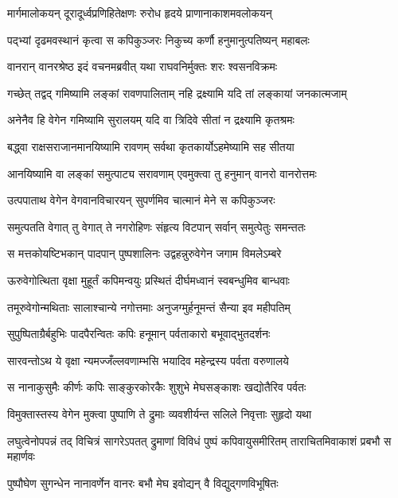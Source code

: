 \twolineshloka
{मार्गमालोकयन् दूरादूर्ध्वप्रणिहितेक्षणः}
{रुरोध हृदये प्राणानाकाशमवलोकयन्} %

\twolineshloka
{पद्भ्यां दृढमवस्थानं कृत्वा स कपिकुञ्जरः}
{निकुच्य कर्णौ हनुमानुत्पतिष्यन् महाबलः} %

\twolineshloka
{वानरान् वानरश्रेष्ठ इदं वचनमब्रवीत्}
{यथा राघवनिर्मुक्तः शरः श्वसनविक्रमः} %

\twolineshloka
{गच्छेत् तद्वद् गमिष्यामि लङ्कां रावणपालिताम्}
{नहि द्रक्ष्यामि यदि तां लङ्कायां जनकात्मजाम्} %

\twolineshloka
{अनेनैव हि वेगेन गमिष्यामि सुरालयम्}
{यदि वा त्रिदिवे सीतां न द्रक्ष्यामि कृतश्रमः} %

\twolineshloka
{बद्ध्वा राक्षसराजानमानयिष्यामि रावणम्}
{सर्वथा कृतकार्योऽहमेष्यामि सह सीतया} %

\twolineshloka
{आनयिष्यामि वा लङ्कां समुत्पाट्य सरावणाम्}
{एवमुक्त्वा तु हनुमान् वानरो वानरोत्तमः} %

\twolineshloka
{उत्पपाताथ वेगेन वेगवानविचारयन्}
{सुपर्णमिव चात्मानं मेने स कपिकुञ्जरः} %

\twolineshloka
{समुत्पतति वेगात् तु वेगात् ते नगरोहिणः}
{संहृत्य विटपान् सर्वान् समुत्पेतुः समन्ततः} %

\twolineshloka
{स मत्तकोयष्टिभकान् पादपान् पुष्पशालिनः}
{उद्वहन्नुरुवेगेन जगाम विमलेऽम्बरे} %

\twolineshloka
{ऊरुवेगोत्थिता वृक्षा मुहूर्तं कपिमन्वयुः}
{प्रस्थितं दीर्घमध्वानं स्वबन्धुमिव बान्धवाः} %

\twolineshloka
{तमूरुवेगोन्मथिताः सालाश्चान्ये नगोत्तमाः}
{अनुजग्मुर्हनूमन्तं सैन्या इव महीपतिम्} %

\twolineshloka
{सुपुष्पिताग्रैर्बहुभिः पादपैरन्वितः कपिः}
{हनूमान् पर्वताकारो बभूवाद्भुतदर्शनः} %

\twolineshloka
{सारवन्तोऽथ ये वृक्षा न्यमज्जँल्लवणाम्भसि}
{भयादिव महेन्द्रस्य पर्वता वरुणालये} %

\twolineshloka
{स नानाकुसुमैः कीर्णः कपिः साङ्कुरकोरकैः}
{शुशुभे मेघसङ्काशः खद्योतैरिव पर्वतः} %

\twolineshloka
{विमुक्तास्तस्य वेगेन मुक्त्वा पुष्पाणि ते द्रुमाः}
{व्यवशीर्यन्त सलिले निवृत्ताः सुहृदो यथा} %

\threelineshloka
{लघुत्वेनोपपन्नं तद् विचित्रं सागरेऽपतत्}
{द्रुमाणां विविधं पुष्पं कपिवायुसमीरितम्}
{ताराचितमिवाकाशं प्रबभौ स महार्णवः} %

\twolineshloka
{पुष्पौघेण सुगन्धेन नानावर्णेन वानरः}
{बभौ मेघ इवोद्यन् वै विद्युद्गणविभूषितः} %

